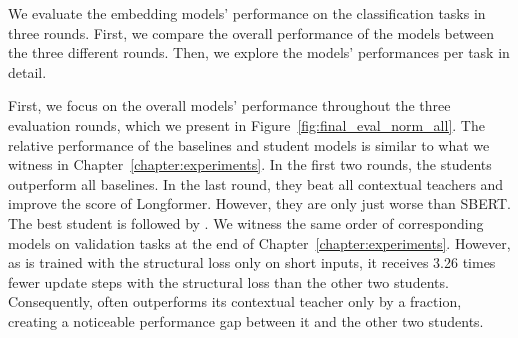 We evaluate the embedding models' performance on the classification tasks in
three rounds. First, we compare the overall performance of the models between
the three different rounds. Then, we explore the models' performances per task
in detail.


First, we focus on the overall models' performance throughout the three
evaluation rounds, which we present in Figure~\ref{fig:final_eval_norm_all}.
The relative performance of the baselines and student models is similar to what
we witness in Chapter~\ref{chapter:experiments}. In the first two rounds, the
students outperform all baselines. In the last round, they beat all contextual
teachers and improve the score of Longformer. However, they are only just worse
than SBERT. The best student is {\OnlyMSEStudent} followed by {\MSEStudent}. We
witness the same order of corresponding models on validation tasks at the end
of Chapter~\ref{chapter:experiments}. However, as {\CosineStudent} is trained
with the structural loss only on short inputs, it receives 3.26 times fewer
update steps with the structural loss than the other two students.
Consequently, {\CosineStudent} often outperforms its contextual teacher only by
a fraction, creating a noticeable performance gap between it and the other two
students.

